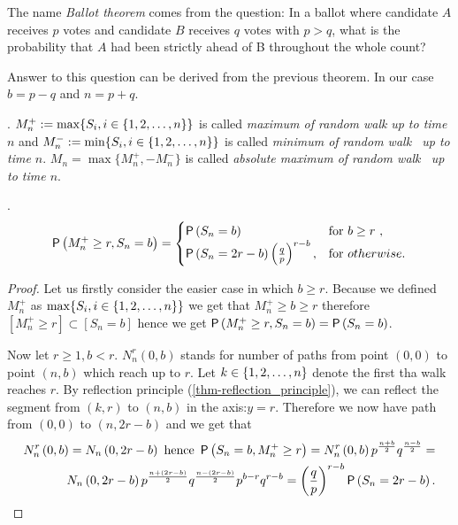  \begin{rem}
   The name \textit{Ballot theorem} comes from the question: In a ballot where candidate $A$ receives $p$ votes and candidate $B$ receives $q$ votes with $p > q$, what is the probability that $A$ had been strictly ahead of B throughout the whole count?

   Answer to this question can be derived from the previous theorem. In our case $b=p-q$ and $n=p+q.$
 \end{rem}
\begin{defn}\label{defn-max}
  \Lrw. $M_n^+:= \max \{S_i, i\in \{1,2,\ldots, n\}\}$ is called \emph{maximum of random walk \rw} \emph{up to time $n$} and $M_n^-:= \min \{S_i, i\in \{1,2,\ldots, n\}\}$ is called \emph{minimum of random walk \rw\ up to time $n.$} $M_n=\max\{M_n^+, -M_n^-\}$ is called \emph{absolute maximum of random walk \rw\ up to time $n.$}
\end{defn}
\begin{thm}\label{thm-probability_maximum_upto_time}
 \Lrw.
 \[
 \operatorname{\mathsf{P}} \left(  M_n^+\geq r, S_n=b \right) =
 \begin{cases}
 \operatorname{\mathsf{P}} \left( S_n=b \right) & \text{for $b \geq r$ },\\
 \operatorname{\mathsf{P}} \left( S_n=2r-b \right) \left( \frac{q}{p} \right) ^{r-b}, & \text{for $otherwise$}.
 \end{cases}
 \]
\end{thm}
\begin{proof}
 Let us firstly consider the easier case in which $b \geq r$. Because we defined $ M_n^+$ as $\max \{S_i, i\in \{1,2,\ldots, n\} \}$ we get that $ M_n^+ \geq b \geq r$
 therefore $[ M_n^+ \geq r] \subset [S_n=b]$ hence we get $\operatorname{\mathsf{P}} \left(  M_n^+\geq r, S_n=b \right) =
 \operatorname{\mathsf{P}} \left( S_n=b \right)$.

 Now let $r\geq 1, b<r$. $N_n^r \left( 0,b \right) $ stands for number of paths from point $ \left( 0,0 \right) $ to point $ \left( n,b \right) $ which reach up to $r$.
 Let $k \in \{1,2,\ldots, n\}$ denote the first \Time tha walk reaches $r$. By reflection principle (\ref{thm-reflection_principle}), we can reflect the segment from $\left(k,r\right)$ to $ \left( n,b \right) $ in the axis:$y=r$.
 Therefore we now have path from $ \left( 0,0 \right) $ to $ \left( n,2r-b \right) $
 and we get that
 \[
 \begin{split}
  N_n^r \left( 0,b \right) =N_n \left( 0,2r-b \right) \text{ hence } \operatorname{\mathsf{P}} \left( S_n=b, M_n^+\geq r \right)
 =N_n^r \left( 0,b \right) p^{\frac{n+b}{2}}q^{\frac{n-b}{2}}=\\
 N_n \left( 0,2r-b \right) p^{\frac{n+ \left( 2r-b \right) }{2}}q^{\frac{n- \left( 2r-b \right) }{2}}p^{b-r}q^{r-b}= \left( \frac{q}{p} \right) ^{r-b}\operatorname{\mathsf{P}} \left( S_n=2r-b \right).
\end{split}
 \]
\end{proof}

